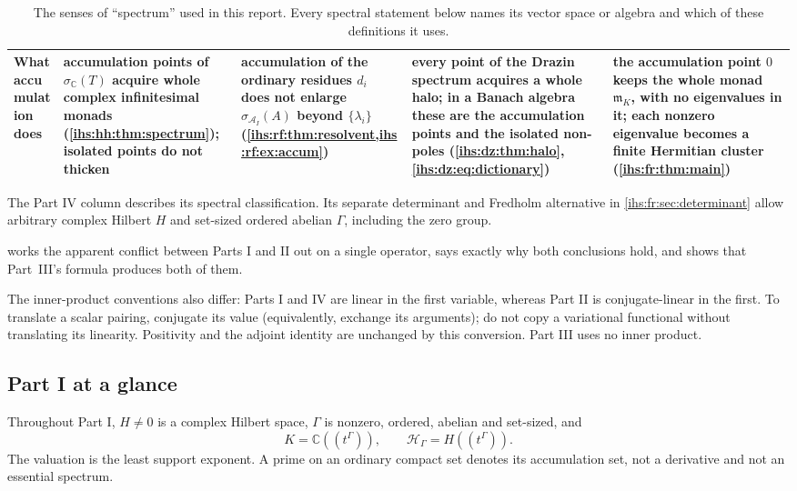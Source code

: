 \documentclass[11pt,a4paper]{article}
\numberwithin{equation}{section}
\theoremstyle{definition}
\theoremstyle{remark}
\newcommand{\C}{\mathbb C}
\newcommand{\K}{K}
\newcommand{\mK}{\mathfrak m_K}
\newcommand{\Hil}{\mathcal H_\Gamma}
\newcommand{\Arf}{\mathcal A_I}
\begin{document}
\begin{table}[p]
\begin{tabularx}{\textwidth}{@{}>{\raggedright\arraybackslash}p{}YYYY@{}}
\addlinespace
What accumulation does &
accumulation points of $\sigma_\C(T)$ acquire whole complex infinitesimal
monads (\cref{ihs:hh:thm:spectrum}); isolated points do not thicken &
accumulation of the ordinary residues $d_i$ does not enlarge
$\sigma_{\Arf}(A)$ beyond $\{\lambda_i\}$
(\cref{ihs:rf:thm:resolvent,ihs:rf:ex:accum}) &
every point of the Drazin spectrum acquires a whole halo; in a Banach
algebra these are the accumulation points and the isolated non-poles
(\cref{ihs:dz:thm:halo}, \eqref{ihs:dz:eq:dictionary}) &
the accumulation point $0$ keeps the whole monad $\mK$, with no eigenvalues
in it; each nonzero eigenvalue becomes a finite Hermitian cluster
(\cref{ihs:fr:thm:main})\\
\bottomrule
\end{tabularx}
\caption{The senses of ``spectrum'' used in this report. Every spectral
statement below names its vector space or algebra and which of these
definitions it uses.}\label{ihs:tab:senses}
\end{table}

The Part IV column describes its spectral classification. Its separate
determinant and Fredholm alternative in \cref{ihs:fr:sec:determinant}
allow arbitrary complex Hilbert $H$ and set-sized ordered abelian $\Gamma$,
including the zero group.

 works the apparent conflict between Parts I and II
out on a single operator, says exactly why both conclusions hold, and shows
that Part~III's formula produces both of them.

The inner-product conventions also differ: Parts I and IV are linear in the
first variable, whereas Part II is conjugate-linear in the first. To
translate a scalar pairing, conjugate its value (equivalently, exchange its
arguments); do not copy a variational functional without translating its
linearity. Positivity and the adjoint identity are unchanged by this
conversion. Part III uses no inner product.

\subsection{Part I at a glance}\label{ihs:sec:glanceone}
Throughout Part I, $H\ne0$ is a complex Hilbert space, $\Gamma$ is nonzero,
ordered, abelian and set-sized, and
\[
 \K=\C((t^\Gamma)),\qquad \Hil=H((t^\Gamma)).
\]
The valuation is the least support exponent. A prime on an ordinary compact
set denotes its accumulation set, not a derivative and not an essential
spectrum.
\end{document}
